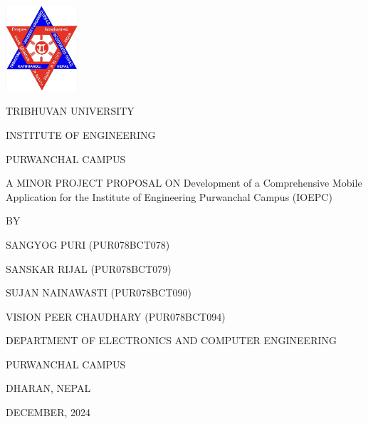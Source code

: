 \begin{titlepage}
    \centering
    
    \includegraphics[width=0.2\textwidth]{Graphics/TULogo.png}\par
    \vspace{1.2cm}
    {\fontsize{14pt}{12pt}\selectfont\textcolor{black}
    TRIBHUVAN UNIVERSITY \par INSTITUTE OF ENGINEERING \par PURWANCHAL CAMPUS \par
    \vspace{1.2cm}
    \begin{flushleft}
    
    \end{flushleft}

    \par A MINOR PROJECT PROPOSAL ON Development of a Comprehensive Mobile Application for the Institute of Engineering Purwanchal Campus (IOEPC) \par

    \vspace{1.2cm}
    BY\par SANGYOG PURI (PUR078BCT078)
      \par SANSKAR RIJAL (PUR078BCT079)
      \par SUJAN NAINAWASTI (PUR078BCT090)
      \par VISION PEER CHAUDHARY (PUR078BCT094)
    \par
    \vspace{1.2cm}\par
    }
    {\fontsize{13pt}{12pt}\selectfont\textcolor{black}
    DEPARTMENT OF ELECTRONICS AND COMPUTER ENGINEERING\par PURWANCHAL CAMPUS\par DHARAN, NEPAL\par
    \vspace{1.2cm}
    \vspace{1.2cm}
    
    DECEMBER, 2024 
    }
\end{titlepage}

